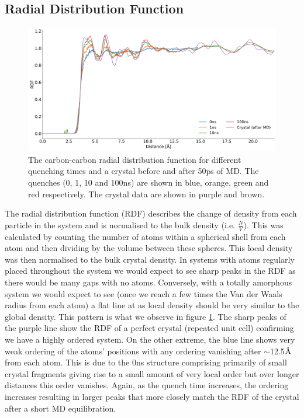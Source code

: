 \subsection{Radial Distribution Function}
\begin{figure}[H]
	\centering
	\includegraphics[width=\textwidth]{../img/DifferentQuenchTimes/RDF.png}
	\caption{\label{fig:RDF}The carbon-carbon radial distribution function for  different quenching times and a crystal before and after 50ps of MD. The quenches (0, 1, 10 and 100ns) are shown in blue, orange, green and red respectively. The crystal data are shown in purple and brown.}
\end{figure}
\noindent The radial distribution function (RDF) describes the change of density from each particle in the system and is normalised to the bulk density (i.e. $\frac{N}{V}$). This was calculated by counting the number of atoms within a spherical shell from each atom and then dividing by the volume between these spheres. This local density was then normalised to the bulk crystal density. In systems with atoms regularly placed throughout the system we would expect to see sharp peaks in the RDF as there would be many gaps with no atoms. Conversely, with a totally amorphous system we would expect to see (once we reach a few times the Van der Waals radius from each atom) a flat line at  as local density should be very similar to the global density. This pattern is what we observe in figure \ref{fig:RDF}. The sharp peaks of the purple line show the RDF of a perfect crystal (repeated unit cell) confirming we have a highly ordered system. On the other extreme, the blue line shows very weak ordering of the atoms' positions with any ordering vanishing after $\sim$12.5$\text{\normalfont\AA}$ from each atom. This is due to the 0ns structure comprising primarily of small crystal fragments giving rise to a small amount of very local order but over longer distances this order vanishes. Again, as the quench time increases, the ordering increases resulting in larger peaks that more closely match the RDF of the crystal after a short MD equilibration.

